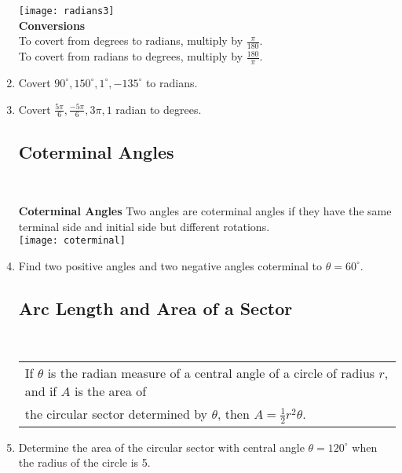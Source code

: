 \begin{enumerate}
\texttt{[image: radians3]}\\[.3in]


\textbf{Conversions}\\
To covert from degrees to radians, multiply by $\frac{\pi}{180}$.\\[.2in]
To covert from radians to degrees, multiply by $\frac{180}{\pi}$.\\

\item Covert $90^\circ, 150^\circ, 1^\circ, -135^\circ$ to radians.\\[1in]
\newpage

\item Covert $\frac{5\pi}{6}, \frac{-5\pi}{6}, 3\pi, 1$ radian to degrees.\\[1in]



\subsection{Coterminal Angles} ~

\textbf{Coterminal Angles}  Two angles are coterminal angles if they have the same terminal side and initial side but different rotations.\\

\texttt{[image: coterminal]}\\

\item Find two positive angles and two negative angles coterminal to $\theta = 60^\circ$.  \\[1in]

\subsection{Arc Length and Area of a Sector} ~


\begin{tabular}{| l |}\hline
If $\theta$ is the radian measure of a central angle of a circle of radius $r$, and if $A$ is the area of \\the circular sector determined by $\theta$, then $A = \frac{1}{2}r^2 \theta$.  \\ \hline
\end{tabular} 
\vspace{-.1in}
\item Determine the area of the circular sector with central angle $\theta = 120^\circ$ when the radius of the circle is 5. \\[.7in]




\end{enumerate}
